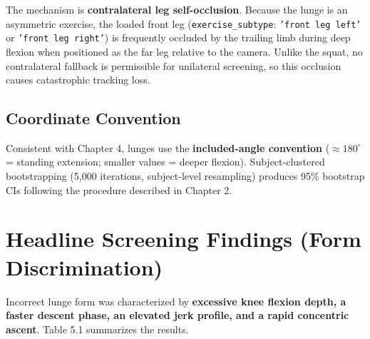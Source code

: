 The mechanism is \textbf{contralateral leg self-occlusion}. Because the lunge is an asymmetric exercise, the loaded front leg (\texttt{exercise\_subtype}: \texttt{'front leg left'} or \texttt{'front leg right'}) is frequently occluded by the trailing limb during deep flexion when positioned as the far leg relative to the camera. Unlike the squat, no contralateral fallback is permissible for unilateral screening, so this occlusion causes catastrophic tracking loss.

\subsection{Coordinate Convention}
\label{sec:5-1-2-coordinate-convention}

Consistent with Chapter 4, lunges use the \textbf{included-angle convention} ($\approx 180^\circ$ = standing extension; smaller values = deeper flexion). Subject-clustered bootstrapping (5,000 iterations, subject-level resampling) produces 95\% bootstrap CIs following the procedure described in Chapter 2.



\section{Headline Screening Findings (Form Discrimination)}
\label{sec:5-2-headline-screening-findings-form-discrimination}


Incorrect lunge form was characterized by \textbf{excessive knee flexion depth, a faster descent phase, an elevated jerk profile, and a rapid concentric ascent}. Table 5.1 summarizes the results.


